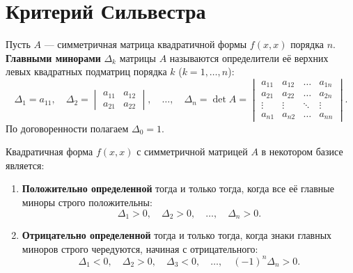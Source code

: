 \section{Критерий Сильвестра}

\begin{definition}
Пусть $A$ --- симметричная матрица квадратичной формы $f(x, x)$ порядка $n$. \textbf{Главными минорами} $\Delta_k$ матрицы $A$ называются определители её верхних левых квадратных подматриц порядка $k$ ($k = 1, \dots, n$):
\[
\Delta_1 = a_{11}, \quad 
\Delta_2 = \begin{vmatrix} a_{11} & a_{12} \\ a_{21} & a_{22} \end{vmatrix}, \quad \dots, \quad 
\Delta_n = \det A = \begin{vmatrix} 
a_{11} & a_{12} & \dots & a_{1n} \\ 
a_{21} & a_{22} & \dots & a_{2n} \\ 
\vdots & \vdots & \ddots & \vdots \\ 
a_{n1} & a_{n2} & \dots & a_{nn} 
\end{vmatrix}.
\]
По договоренности полагаем $\Delta_0 = 1$.
\end{definition}

\begin{theorem}
Квадратичная форма $f(x, x)$ с симметричной матрицей $A$ в некотором базисе является:
\begin{enumerate}
    \item \textbf{Положительно определенной} тогда и только тогда, когда все её главные миноры строго положительны:
    \[
    \Delta_1 > 0, \quad \Delta_2 > 0, \quad \dots, \quad \Delta_n > 0.
    \]
    \item \textbf{Отрицательно определенной} тогда и только тогда, когда знаки главных миноров строго чередуются, начиная с отрицательного:
    \[
    \Delta_1 < 0, \quad \Delta_2 > 0, \quad \Delta_3 < 0, \quad \dots, \quad (-1)^n \Delta_n > 0.
    \]
\end{enumerate}
\end{theorem}

